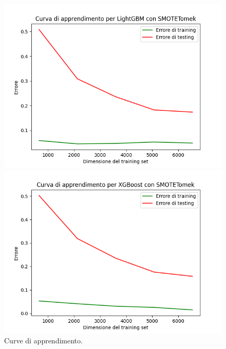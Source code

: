 \begin{figure}[H]
    \begin{minipage}[b]{0.45\linewidth}
      \centering
      \includegraphics[scale=0.5]{img/learning_curve_LightGBM_SMOTETomek.png}
      
    \end{minipage}
    \hfill
    \begin{minipage}[b]{0.45\linewidth}
      \centering
      \includegraphics[scale=0.5]{img/learning_curve_XGBoost_SMOTETomek.png}
      
    \end{minipage}
    \caption{Curve di apprendimento.}
    
    \end{figure}

